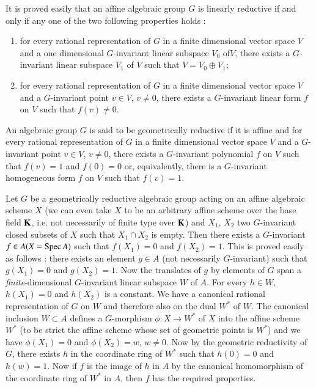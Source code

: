 It is proved easily that an affine algebraic group $G$ is linearly reductive if and only if any one of the two following properties holds :
\begin{enumerate}
\renewcommand{\labelenumi}{(\theenumi)}
\item for every rational representation of $G$ in a finite dimensional vector space $V$ and a one dimensional $G$-invariant linear subspace $V_{0}$ of\pageoriginale $V$, there exists a $G$-invariant linear subspace $V_{1}$ of $V$ such that $V=V_{0}\oplus V_{1}$;

\item for every rational representation of $G$ in a finite dimensional vector space $V$ and a $G$-invariant point $v\in V$, $v\neq 0$, there exists a $G$-invariant linear form $f$ on $V$ such that $f(v)\neq 0$.
\end{enumerate}

\begin{definition}\label{art18-defi3}
An algebraic group $G$ is said to be geometrically reductive if it is affine and for every rational representation of $G$ in a finite dimensional vector space $V$ and a $G$-invariant point $v\in V$, $v\neq 0$, there exists a $G$-invariant polynomial $f$ on $V$ such that $f(v)=1$ and $f(0)=0$ or, equivalently, there is a $G$-invariant homogeneous form $f$ on $V$ such that $f(v)=1$.
\end{definition}

Let $G$ be a geometrically reductive algebraic group acting on an affine algebraic scheme $X$ (we can even take $X$ to be an arbitrary affine scheme over the base field $\mathbf{K}$, i.e. not necessarily of finite type over $\mathbf{K}$) and $X_{1}$, $X_{2}$ two $G$-invariant closed subsets of $X$ such that $X_{1}\cap X_{2}$ is empty. Then there exists a $G$-invariant $f\in A(X=\operatorname{\mathrm{Spec}} A)$ such that $f(X_{1})=0$ and $f(X_{2})=1$. This is proved easily as follows : there exists an element $g\in A$ (not necessarily $G$-invariant) such that $g(X_{1})=0$ and $g(X_{2})=1$. Now the translates of $g$ by elements of $G$ span a {\em finite}-dimensional $G$-invariant linear subspace $W$ of $A$. For every $h\in W$, $h(X_{1})=0$ and $h(X_{2})$ is a constant. We have a canonical rational representation of $G$ on $W$ and therefore also on the dual $W^{*}$ of $W$. The canonical inclusion $W\subset A$ defines a $G$-morphism $\phi:X\to W^{*}$ of $X$ into the affine scheme $W^{*}$ (to be strict the affine scheme whose set of geometric points is $W^{*}$) and we have $\phi (X_{1})=0$ and $\phi(X_{2})=w$, $w\neq 0$. Now by the geometric reductivity of $G$, there exists $h$ in the coordinate ring of $W^{*}$ such that $h(0)=0$ and $h(w)=1$. Now if $f$ is the image of $h$ in $A$ by the canonical homomorphism of the coordinate ring of $W^{*}$ in $A$, then $f$ has the required properties.

